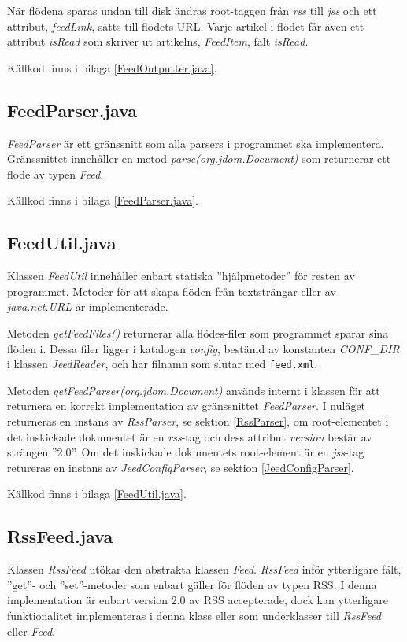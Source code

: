 \documentclass[titlepage, twoside, a4paper, 12pt]{article}
\begin{document}
När flödena sparas undan till disk ändras root-taggen från
\textit{rss} till \textit{jss} och ett attribut, \textit{feedLink},
sätts till flödets URL. Varje artikel i flödet får även ett attribut
\textit{isRead} som skriver ut artikelns, \textit{FeedItem}, fält
\textit{isRead}.

Källkod finns i bilaga \ref{FeedOutputter.java}.

\subsection{FeedParser.java}\label{FeedParser}
\textit{FeedParser} är ett gränssnitt som alla parsers i programmet
ska implementera. Gränssnittet innehåller en metod
\textit{parse(org.jdom.Document)} som returnerar ett flöde av typen
\textit{Feed}.

Källkod finns i bilaga \ref{FeedParser.java}.

\subsection{FeedUtil.java}\label{FeedUtil}
Klassen \textit{FeedUtil} innehåller enbart statiska
''hjälp\-metoder'' för resten av programmet. Metoder för att skapa
flöden från textsträngar eller av \textit{java.net.URL} är
implementerade.

Metoden \textit{getFeedFiles()}\label{getFeedFiles()} returnerar alla
flödes-filer som programmet sparar sina flöden i. Dessa filer ligger i
katalogen \textit{config}, bestämd av konstanten \textit{CONF\_DIR} i
klassen \textit{JeedReader}, och har filnamn som slutar med
\verb!feed.xml!.

Metoden \textit{getFeedParser(org.jdom.Document)} används internt i
klassen för att returnera en korrekt implementation av gränssnittet
\textit{FeedParser}. I nuläget returneras en instans av
\textit{RssParser}, se sektion \ref{RssParser}, om root-elementet i
det inskickade dokumentet är en \textit{rss}-tag och dess attribut
\textit{version} består av strängen ''2.0''. Om det inskickade
dokumentets root-element är en \textit{jss}-tag retureras en instans
av \textit{JeedConfigParser}, se sektion \ref{JeedConfigParser}.

Källkod finns i bilaga \ref{FeedUtil.java}.

\subsection{RssFeed.java}\label{RssFeed}
Klassen \textit{RssFeed} utökar den abstrakta klassen
\textit{Feed}. \textit{RssFeed} inför ytterligare fält, ''get''- och
''set''-metoder som enbart gäller för flöden av typen RSS. I denna
implementation är enbart version 2.0 av RSS accepterade, dock kan
ytterligare funktionalitet implementeras i denna klass eller som
underklasser till \textit{RssFeed} eller \textit{Feed}.
\end{document}
